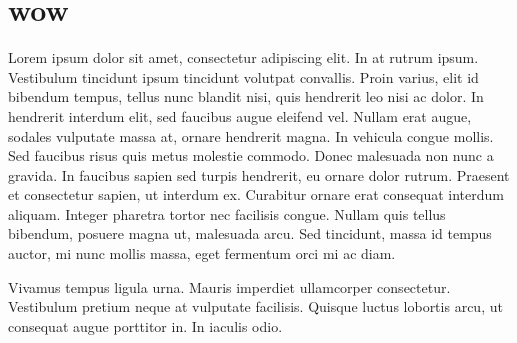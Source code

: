 \section{wow}

Lorem ipsum dolor sit amet, consectetur adipiscing elit. In at rutrum ipsum. Vestibulum tincidunt ipsum tincidunt volutpat convallis. Proin varius, elit id bibendum tempus, tellus nunc blandit nisi, quis hendrerit leo nisi ac dolor. In hendrerit interdum elit, sed faucibus augue eleifend vel. Nullam erat augue, sodales vulputate massa at, ornare hendrerit magna. In vehicula congue mollis. Sed faucibus risus quis metus molestie commodo. Donec malesuada non nunc a gravida. In faucibus sapien sed turpis hendrerit, eu ornare dolor rutrum. Praesent et consectetur sapien, ut interdum ex. Curabitur ornare erat consequat interdum aliquam. Integer pharetra tortor nec facilisis congue. Nullam quis tellus bibendum, posuere magna ut, malesuada arcu. Sed tincidunt, massa id tempus auctor, mi nunc mollis massa, eget fermentum orci mi ac diam.

Vivamus tempus ligula urna. Mauris imperdiet ullamcorper consectetur. Vestibulum pretium neque at vulputate facilisis. Quisque luctus lobortis arcu, ut consequat augue porttitor in. In iaculis odio.

